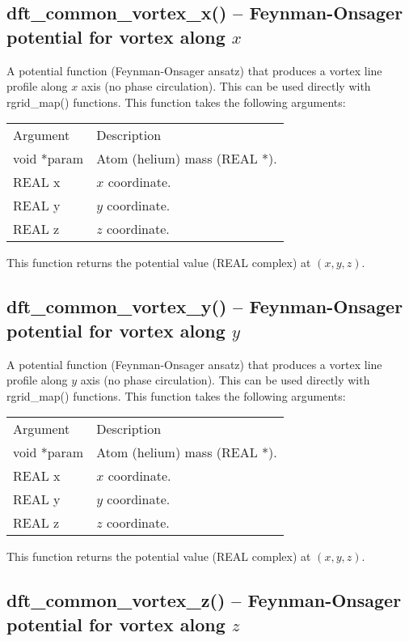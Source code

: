 \documentclass[12pt,letterpaper]{report}
\begin{document}
\subsection{dft\_common\_vortex\_x() -- Feynman-Onsager potential for vortex along $x$}

A potential function (Feynman-Onsager ansatz) that produces a vortex line profile along $x$ axis (no phase circulation). This can be used directly with rgrid\_map() functions. This function takes the following arguments:
\begin{longtable}{p{} p{}}
Argument & Description\\
\cline{1-2}
void *param & Atom (helium) mass (REAL *).\\
REAL x & $x$ coordinate.\\
REAL y & $y$ coordinate.\\
REAL z & $z$ coordinate.\\
\end{longtable}
\noindent
This function returns the potential value (REAL complex) at $(x, y, z)$. 

\subsection{dft\_common\_vortex\_y() -- Feynman-Onsager potential for vortex along $y$}

A potential function (Feynman-Onsager ansatz) that produces a vortex line profile along $y$ axis (no phase circulation). This can be used directly with rgrid\_map() functions. This function takes the following arguments:
\begin{longtable}{p{} p{}}
Argument & Description\\
\cline{1-2}
void *param & Atom (helium) mass (REAL *).\\
REAL x & $x$ coordinate.\\
REAL y & $y$ coordinate.\\
REAL z & $z$ coordinate.\\
\end{longtable}
\noindent
This function returns the potential value (REAL complex) at $(x, y, z)$. 

\subsection{dft\_common\_vortex\_z() -- Feynman-Onsager potential for vortex along $z$}
\end{document}
